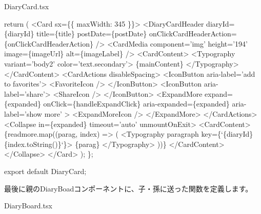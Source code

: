 \begin{starterprogram}[]{DiaryCard.tsx}
{    return (
      \textless{}Card sx=\{\{ maxWidth: 345 \}\}\textgreater{}
        \textless{}DiaryCardHeader
          diaryId=\{diaryId\}
          title=\{title\}
          postDate=\{postDate\}
          onClickCardHeaderAction=\{onClickCardHeaderAction\}
        /\textgreater{}
        \textless{}CardMedia
          component='img'
          height='194'
          image=\{imageUrl\}
          alt=\{imageLabel\}
        /\textgreater{}
        \textless{}CardContent\textgreater{}
          \textless{}Typography variant='body2' color='text.secondary'\textgreater{}
            \{mainContent\}
          \textless{}/Typography\textgreater{}
        \textless{}/CardContent\textgreater{}
        \textless{}CardActions disableSpacing\textgreater{}
          \textless{}IconButton aria{-}label='add to favorites'\textgreater{}
            \textless{}FavoriteIcon /\textgreater{}
          \textless{}/IconButton\textgreater{}
          \textless{}IconButton aria{-}label='share'\textgreater{}
            \textless{}ShareIcon /\textgreater{}
          \textless{}/IconButton\textgreater{}
          \textless{}ExpandMore
            expand=\{expanded\}
            onClick=\{handleExpandClick\}
            aria{-}expanded=\{expanded\}
            aria{-}label='show more'
          \textgreater{}
            \textless{}ExpandMoreIcon /\textgreater{}
          \textless{}/ExpandMore\textgreater{}
        \textless{}/CardActions\textgreater{}
        \textless{}Collapse in=\{expanded\} timeout='auto' unmountOnExit\textgreater{}
          \textless{}CardContent\textgreater{}
            \{readmore.map((parag, index) =\textgreater{} (
              \textless{}Typography paragraph key=\{`\textdollar{}\{diaryId\}\textdollar{}\{index.toString()\}`\}\textgreater{}
                \{parag\}
              \textless{}/Typography\textgreater{}
            ))\}
          \textless{}/CardContent\textgreater{}
        \textless{}/Collapse\textgreater{}
      \textless{}/Card\textgreater{}
    );
  \};

  export default DiaryCard;
}\end{starterprogram}

最後に親のDiaryBoadコンポーネントに、子・孫に送った関数を定義します。

\def\startercodeblockfontsize{}
\begin{starterprogram}[]{DiaryBoard.tsx}\end{starterprogram}

